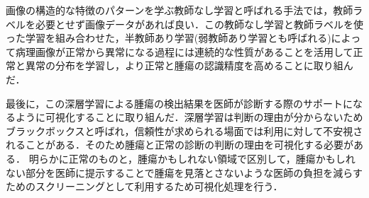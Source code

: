 画像の構造的な特徴のパターンを学ぶ教師なし学習と呼ばれる手法では，教師ラベルを必要とせず画像データがあれば良い．この教師なし学習と教師ラベルを使った学習を組み合わせた，半教師あり学習(弱教師あり学習とも呼ばれる)によって病理画像が正常から異常になる過程には連続的な性質があることを活用して正常と異常の分布を学習し，より正常と腫瘍の認識精度を高めることに取り組んだ．

最後に，この深層学習による腫瘍の検出結果を医師が診断する際のサポートになるように可視化することに取り組んだ．深層学習は判断の理由が分からないためブラックボックスと呼ばれ，信頼性が求められる場面では利用に対して不安視されることがある．そのため腫瘍と正常の診断の判断の理由を可視化する必要がある．
明らかに正常のものと，腫瘍かもしれない領域で区別して，腫瘍かもしれない部分を医師に提示することで腫瘍を見落とさないような医師の負担を減らすためのスクリーニングとして利用するため可視化処理を行う．

